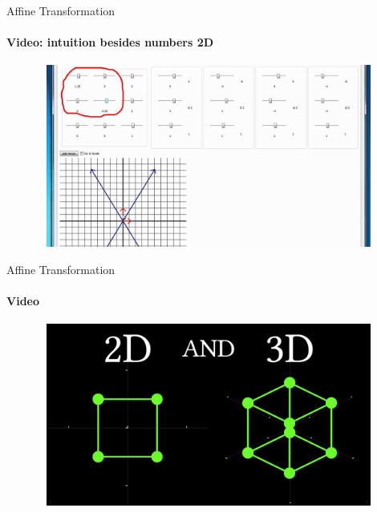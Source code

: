 \documentclass[aspectratio=169]{beamer}
\begin{document}
\begin{frame}[t]{Affine Transformation}
    \framesubtitle{Video: intuition besides numbers 2D}
    \vspace{-0.6cm}
    \begin{figure}[H]
        \href{https://youtu.be/Y_TKQKdWC2k}{
            \centering\includegraphics[height=6cm,width=1\textwidth,keepaspectratio]{num_intuition.jpg}}
        \label{fig:num_intuition.jpg}
    \end{figure}
\end{frame}

\begin{frame}[t]{Affine Transformation}
    \framesubtitle{Video}
    \vspace{-0.6cm}
    \begin{figure}[H]
        \href{https://youtu.be/E3Phj6J287o}{
            \centering\includegraphics[height=6cm,width=1\textwidth,keepaspectratio]{num_intuition_3d.jpg}}
        \label{fig:num_intuition_3d.jpg}
    \end{figure}
\end{frame}
\end{document}
